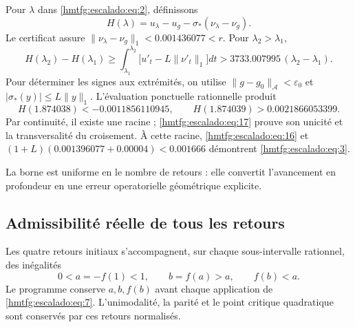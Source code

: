 Pour \(\lambda\) dans \eqref{hmtfg:escalado:eq:2}, définissons
\[
H(\lambda)=u_\lambda-u_g-
\sigma_*(\nu_\lambda-\nu_g).
\]
Le certificat assure \(\|\nu_\lambda-\nu_g\|_1<0.001436077<r\). Pour \(\lambda_2>\lambda_1\),
\begin{equation}
H(\lambda_2)-H(\lambda_1)
\ge\int_{\lambda_1}^{\lambda_2}
\bigl[u'_t-L\|\nu'_t\|_1\bigr]dt
>3733.007995\,(\lambda_2-\lambda_1).
\label{hmtfg:escalado:eq:17}
\end{equation}
Pour déterminer les signes aux extrémités, on utilise \(\|g-g_0\|_{\mathcal A}<\varepsilon_0\) et \(|\sigma_*(y)|\le L\|y\|_1\). L’évaluation ponctuelle rationnelle produit
\begin{equation}
H(1.874038)<-0.0011856110945,
\qquad H(1.874039)>0.0021866053399.
\label{hmtfg:escalado:eq:18}
\end{equation}
Par continuité, il existe une racine ; \eqref{hmtfg:escalado:eq:17} prouve son unicité et la transversalité du croisement. À cette racine, \eqref{hmtfg:escalado:eq:16} et
\((1+L)(0.001396077+0.00004)<0.001666\)
démontrent \eqref{hmtfg:escalado:eq:3}.

La borne est uniforme en le nombre de retours : elle convertit l’avancement en profondeur en une erreur operatorielle géométrique explicite.


\subsection{Admissibilité réelle de tous les retours}
\label{hmtfg:escalado:7}

Les quatre retours initiaux s’accompagnent, sur chaque sous-intervalle rationnel, des inégalités
\begin{equation}
0<a=-f(1)<1,\qquad b=f(a)>a,\qquad f(b)<a.
\label{hmtfg:escalado:eq:19}
\end{equation}
Le programme conserve \(a,b,f(b)\) avant chaque application de \eqref{hmtfg:escalado:eq:7}. L’unimodalité, la parité et le point critique quadratique sont conservés par ces retours normalisés.

